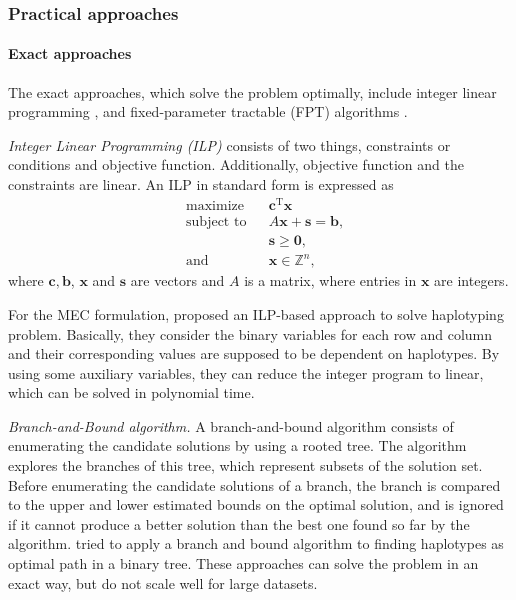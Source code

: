 \subsubsection{Practical approaches}
\paragraph{Exact approaches} The exact approaches, which solve the problem optimally, include integer linear programming \citep{Fouilhoux2012,CDW13_exact}, and fixed-parameter tractable (FPT) algorithms \citep{he2010optimal,Patterson2015,Pirola2015}.

\textit{Integer Linear Programming (ILP)} consists of two things, constraints or conditions and objective function. Additionally, objective function and the constraints are linear.
An ILP in standard form is expressed as
\[{\begin{aligned}&{\text{maximize}}&&\mathbf {c} ^{\mathrm {T} }\mathbf {x} \\&{\text{subject to}}&&A\mathbf {x} +\mathbf {s} =\mathbf {b} ,\\&&&\mathbf {s} \geq \mathbf {0} ,\\&{\text{and}}&&\mathbf {x} \in \mathbb {Z} ^{n},\end{aligned}}\]
where $\displaystyle \mathbf {c} ,\mathbf {b} $, $\mathbf {x}$ and $\mathbf {s}$ are vectors and $\displaystyle A $ is a matrix, where entries in $\mathbf {x}$ are integers.

For the MEC formulation, \cite{CDW13_exact} proposed an ILP-based approach to solve haplotyping problem.
Basically, they consider the binary variables for each row and column and their corresponding values are supposed to be dependent on haplotypes.
By using some auxiliary variables, they can reduce the integer program to linear, which can be solved in polynomial time.

\textit{Branch-and-Bound algorithm.}
A branch-and-bound algorithm consists of enumerating the candidate solutions by using a rooted tree.
The algorithm explores the branches of this tree, which represent subsets of the solution set.
Before enumerating the candidate solutions of a branch, the branch is compared to the upper and lower estimated bounds on the optimal solution, and is ignored if it cannot produce a better solution than the best one found so far by the algorithm.
\cite{wang2005haplotype} tried to apply a branch
and bound algorithm to finding haplotypes as optimal path in a binary tree. These approaches can solve the problem in an exact way, but do not scale well for large datasets.

